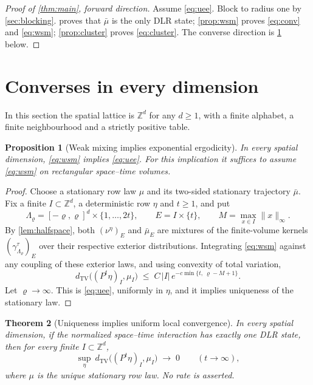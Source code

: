 \documentclass[11pt]{article}
\theoremstyle{plain}
\newtheorem{theorem}{Theorem}[section]
\newtheorem{proposition}[theorem]{Proposition}
\theoremstyle{definition}
\theoremstyle{remark}
\newcommand{\Z}{\mathbb{Z}}
\newcommand{\dtv}{d_{\mathrm{TV}}}
\newcommand{\Lam}{\Lambda}
\newcommand{\ba}{\bar{\mu}}
\begin{document}
\begin{proof}[Proof of \cref{thm:main}, forward direction]
Assume \eqref{eq:uee}. Block to radius one by \cref{sec:blocking}.  proves that $\ba$ is the only DLR state; \cref{prop:wsm} proves \eqref{eq:conv} and \eqref{eq:wsm}; \cref{prop:cluster} proves \eqref{eq:cluster}. The converse direction is \cref{prop:wsm-to-erg} below.
\end{proof}

\section{Converses in every dimension}
\label{sec:converse}

In this section the spatial lattice is $\Z^d$ for any $d\ge1$, with a finite alphabet, a finite neighbourhood and a strictly positive table.

\begin{proposition}[Weak mixing implies exponential ergodicity]
\label{prop:wsm-to-erg}
In every spatial dimension, \eqref{eq:wsm} implies \eqref{eq:uee}. For this implication it suffices to assume \eqref{eq:wsm} on rectangular space--time volumes.
\end{proposition}

\begin{proof}
Choose a stationary row law $\mu$ and its two-sided stationary trajectory $\ba$. Fix a finite $I\subset\Z^d$, a deterministic row $\eta$ and $t\ge1$, and put
\[
\Lam_\varrho=[-\varrho,\varrho]^d\times\{1,\dots,2t\},\qquad E=I\times\{t\},\qquad M=\max_{x\in I}\|x\|_\infty.
\]
By \cref{lem:halfspace}, both $(\nu^\eta)_E$ and $\ba_E$ are mixtures of the finite-volume kernels $(\gamma^\tau_{\Lam_\varrho})_E$ over their respective exterior distributions. Integrating \eqref{eq:wsm} against any coupling of these exterior laws, and using convexity of total variation,
\[
\dtv\bigl((P^t\eta)_I,\mu_I\bigr)\;\le\;C\,|I|\,e^{-c\min\{t,\ \varrho-M+1\}}.
\]
Let $\varrho\to\infty$. This is \eqref{eq:uee}, uniformly in $\eta$, and it implies uniqueness of the stationary law.
\end{proof}

\begin{theorem}[Uniqueness implies uniform local convergence]
\label{thm:qualitative}
In every spatial dimension, if the normalized space--time interaction has exactly one DLR state, then for every finite $I\subset\Z^d$,
\begin{equation}
\sup_\eta\ \dtv\bigl((P^t\eta)_I,\mu_I\bigr)\;\longrightarrow\;0\qquad(t\to\infty),
\label{eq:qualitative}
\end{equation}
where $\mu$ is the unique stationary row law. No rate is asserted.
\end{theorem}
\end{document}
